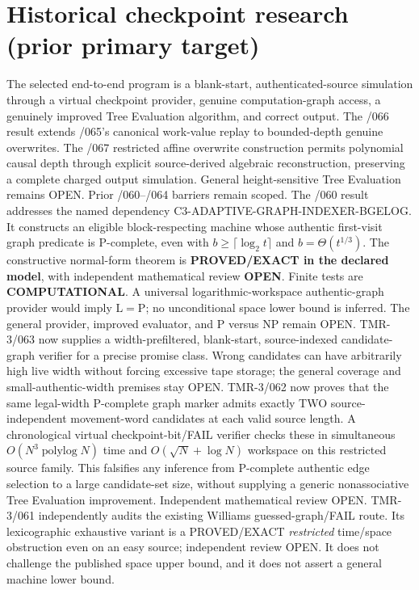 \documentclass[11pt]{article}
\begin{document}
\section{Historical checkpoint research (prior primary target)}
The selected end-to-end program is a blank-start, authenticated-source
simulation through a virtual checkpoint provider, genuine computation-graph
access, a genuinely improved Tree Evaluation algorithm, and correct output.
The /066 result extends /065's canonical work-value replay to bounded-depth
genuine overwrites. The /067 restricted affine overwrite construction
permits polynomial causal depth through explicit source-derived algebraic
reconstruction, preserving a complete charged output simulation. General height-sensitive Tree Evaluation
remains OPEN. Prior /060--/064 barriers remain scoped.
The /060 result addresses the named dependency
\textsf{C3-ADAPTIVE-GRAPH-INDEXER-BGELOG}.
It constructs an eligible block-respecting machine whose authentic
first-visit graph predicate is P-complete, even with
$b\geq\lceil\log_2 t\rceil$ and $b=\Theta(t^{1/3})$.
The constructive normal-form theorem is \textbf{PROVED/EXACT in the declared
model}, with independent mathematical review \textbf{OPEN}.
Finite tests are \textbf{COMPUTATIONAL}.
A universal logarithmic-workspace authentic-graph provider would imply
$\mathrm L=\mathrm P$; no unconditional space lower bound is inferred.
The general provider, improved evaluator, and P versus NP remain OPEN.
TMR-3/063 now supplies a width-prefiltered, blank-start, source-indexed
candidate-graph verifier for a precise promise class. Wrong candidates
can have arbitrarily high live width without forcing excessive tape
storage; the general coverage and small-authentic-width premises stay OPEN.
TMR-3/062 now proves that the same legal-width P-complete graph marker
admits exactly TWO source-independent movement-word candidates at each
valid source length. A chronological virtual checkpoint-bit/FAIL verifier
checks these in simultaneous $O(N^3\operatorname{polylog}N)$ time and
$O(\sqrt N+\log N)$ workspace on this restricted source family. This
falsifies any inference from P-complete authentic edge selection to
a large candidate-set size, without supplying a generic nonassociative
Tree Evaluation improvement. Independent mathematical review OPEN.
TMR-3/061 independently audits the existing Williams guessed-graph/FAIL
route. Its lexicographic exhaustive variant is a PROVED/EXACT
\emph{restricted} time/space obstruction even on an easy source;
independent review OPEN. It does not challenge the published space
upper bound, and it does not assert a general machine lower bound.
\end{document}
